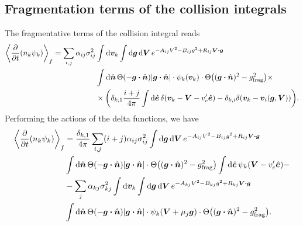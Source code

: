 \documentclass[aps,prl,preprint,groupedaddress,10pt]{revtex4-2}
\begin{document}
\subsection{Fragmentation terms of the collision integrals}
The fragmentative terms of the collision integral reads
\begin{equation}
    \begin{split}
        \avg{\pdv{t}(n_k\psi_k)}_f=\sum_{i,j}\alpha_{ij}\sigma_{ij}^2&\int\dd{\bv_k}\int
        \dd{\bg}\dd{\bV}e^{-A_{ij}V^2-B_{ij}g^2+R_{ij}\bV\vdot\bg}\\
        &\int\dd{\bn}\Theta\pqty{-\bg\vdot\bn}\abs{\bg\vdot\bn}\cdot\psi_k(\bv_k)\cdot
        \Theta\pqty{(\bg\vdot\bn)^2-\ltx{g}{frag}^2}\times\\
        &\times\pqty{\delta_{k,1}\frac{i+j}{4\pi}\int\dd{\be}\delta\pqty{\bv_k-\bV-v'_c\be}
            -\delta_{k,i}\delta\pqty{\bv_k-\bv_i(\bg,\bV)}}.
    \end{split}
\end{equation}
Performing the actions of the delta functions, we have
\begin{equation}
    \begin{split}
        \avg{\pdv{t}(n_k\psi_k)}_f&=\frac{\delta_{k,1}}{4\pi}\sum_{i,j}(i+j)
        \alpha_{ij}\sigma_{ij}^2\int\dd{\bg}\dd{\bV}e^{-A_{ij}V^2-B_{ij}g^2+R_{ij}\bV\vdot\bg}\\
        &\int\dd{\bn}\Theta\pqty{-\bg\vdot\bn}\abs{\bg\vdot\bn}\cdot
        \Theta\pqty{(\bg\vdot\bn)^2-\ltx{g}{frag}^2}
        \int\dd{\be}\psi_k(\bV-v'_c\be)-\\
        &-\sum_{j}\alpha_{kj}\sigma_{kj}^2\int\dd{\bv_k}\int
        \dd{\bg}\dd{\bV}e^{-A_{kj}V^2-B_{kj}g^2+R_{kj}\bV\vdot\bg}\\
        &\int\dd{\bn}\Theta\pqty{-\bg\vdot\bn}\abs{\bg\vdot\bn}\cdot\psi_k(\bV+\mu_j\bg)\cdot
        \Theta\pqty{(\bg\vdot\bn)^2-\ltx{g}{frag}^2}.
    \end{split}
\end{equation}
\end{document}

